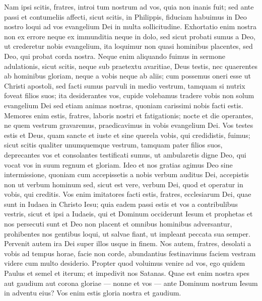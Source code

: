 \begin{biblechapter}
\begin{biblechapter}
\verse Nam ipsi scitis, fratres, introi tum nostrum ad vos, quia non inanis fuit; 
\verse sed ante passi et contumeliis affecti, sicut scitis, in Philippis, fiduciam habuimus in Deo nostro loqui ad vos evangelium Dei in multa sollicitudine. 
\verse Exhortatio enim nostra non ex errore neque ex immunditia neque in dolo, 
\verse sed sicut probati sumus a Deo, ut crederetur nobis evangelium, ita loquimur non quasi hominibus placentes, sed Deo, qui probat corda nostra. 
\verse Neque enim aliquando fuimus in sermone adulationis, sicut scitis, neque sub praetextu avaritiae, Deus testis, 
\verse nec quaerentes ab hominibus gloriam, neque a vobis neque ab aliis; 
\verse cum possemus oneri esse ut Christi apostoli, sed facti sumus parvuli in medio vestrum, tamquam si nutrix foveat filios suos; 
\verse ita desiderantes vos, cupide volebamus tradere vobis non solum evangelium Dei sed etiam animas nostras, quoniam carissimi nobis facti estis. 
\verse Memores enim estis, fratres, laboris nostri et fatigationis; nocte et die operantes, ne quem vestrum gravaremus, praedicavimus in vobis evangelium Dei. 
\verse Vos testes estis et Deus, quam sancte et iuste et sine querela vobis, qui credidistis, fuimus; 
\verse sicut scitis qualiter unumquemque vestrum, tamquam pater filios suos, 
\verse deprecantes vos et consolantes testificati sumus, ut ambularetis digne Deo, qui vocat vos in suum regnum et gloriam.
 \verse Ideo et nos gratias agimus Deo sine intermissione, quoniam cum accepissetis a nobis verbum auditus Dei, accepistis non ut verbum hominum sed, sicut est vere, verbum Dei, quod et operatur in vobis, qui creditis. 
\verse Vos enim imitatores facti estis, fratres, ecclesiarum Dei, quae sunt in Iudaea in Christo Iesu; quia eadem passi estis et vos a contribulibus vestris, sicut et ipsi a Iudaeis, 
 \verse qui et Dominum occiderunt Iesum et prophetas et nos persecuti sunt et Deo non placent et omnibus hominibus adversantur, 
\verse prohibentes nos gentibus loqui, ut salvae fiant, ut impleant peccata sua semper. Pervenit autem ira Dei super illos usque in finem.
 \verse Nos autem, fratres, desolati a vobis ad tempus horae, facie non corde, abundantius festinavimus faciem vestram videre cum multo desiderio. 
\verse Propter quod voluimus venire ad vos, ego quidem Paulus et semel et iterum; et impedivit nos Satanas. 
\verse Quae est enim nostra spes aut gaudium aut corona gloriae — nonne et vos — ante Dominum nostrum Iesum in adventu eius? 
\verse Vos enim estis gloria nostra et gaudium.
 

\end{biblechapter}
\end{biblechapter}
